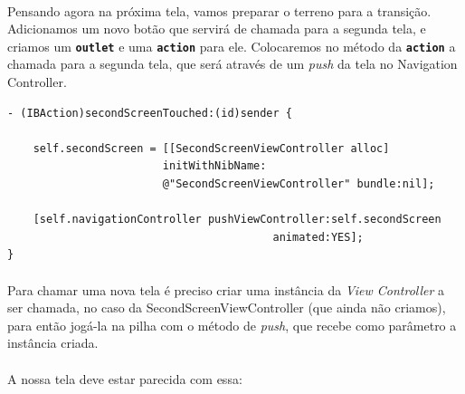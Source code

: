 \documentclass[a4paper,12pt,brazil,doubleside]{book}
\begin{document}
\paragraph{}Pensando agora na próxima tela, vamos preparar o terreno para a transição. Adicionamos um novo botão que servirá de chamada para a segunda tela, e criamos um \texttt{\textbf{outlet}} e uma \texttt{\textbf{action}} para ele. Colocaremos no método da \texttt{\textbf{action}} a chamada para a segunda tela, que será através de um \emph{push} da tela no Navigation Controller.

\begin{listing}
\begin{verbatim}
- (IBAction)secondScreenTouched:(id)sender {
    
    self.secondScreen = [[SecondScreenViewController alloc]
                        initWithNibName:
                        @"SecondScreenViewController" bundle:nil];
    
    [self.navigationController pushViewController:self.secondScreen
                                         animated:YES];
}
\end{verbatim}
\end{listing}

\paragraph{}Para chamar uma nova tela é preciso criar uma instância da \emph{View Controller} a ser chamada, no caso da SecondScreenViewController (que ainda não criamos), para então jogá-la na pilha com o método de \emph{push}, que recebe como parâmetro a instância criada.
\paragraph{}A nossa tela deve estar parecida com essa:
\end{document}
